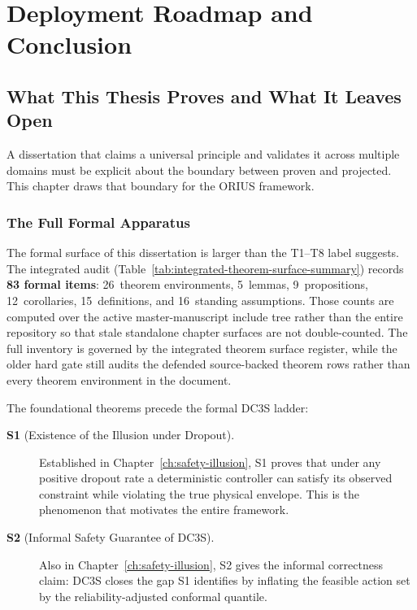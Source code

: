 \chapter{Deployment Roadmap and Conclusion}
\label{ch:ch08_conclusion}


\section{What This Thesis Proves and What It Leaves Open}
\label{ch:what-proves}

A dissertation that claims a universal principle and validates it across multiple
domains must be explicit about the boundary between proven and projected.
This chapter draws that boundary for the ORIUS framework.

\subsection{The Full Formal Apparatus}

The formal surface of this dissertation is larger than the T1--T8 label
suggests.  The integrated audit (Table~\ref{tab:integrated-theorem-surface-summary})
records \textbf{83 formal items}: 26~theorem environments, 5~lemmas,
9~propositions, 12~corollaries, 15~definitions, and 16~standing
assumptions.  Those counts are computed over the active master-manuscript
include tree rather than the entire repository so that stale standalone
chapter surfaces are not double-counted.  The full inventory is governed by
the integrated theorem surface register, while the older hard gate still
audits the defended source-backed theorem rows rather than every theorem
environment in the document.

The foundational theorems precede the formal DC3S ladder:

\begin{description}
  \item[\textbf{S1} (Existence of the Illusion under Dropout).]
    Established in Chapter~\ref{ch:safety-illusion},
    S1 proves that under any positive dropout rate a deterministic
    controller can satisfy its observed constraint while violating the
    true physical envelope.  This is the phenomenon that motivates
    the entire framework.
  \item[\textbf{S2} (Informal Safety Guarantee of DC3S).]
    Also in Chapter~\ref{ch:safety-illusion}, S2 gives
    the informal correctness claim: DC3S closes the gap S1 identifies
    by inflating the feasible action set by the reliability-adjusted
    conformal quantile.
\end{description}

